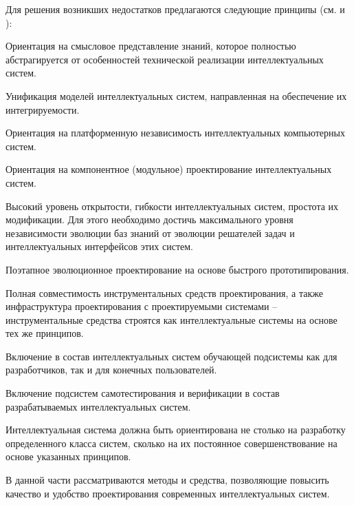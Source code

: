 \begin{partbacktext}
Для решения возникших недостатков предлагаются следующие принципы (см.  и ):
\begin{textitemize}
	\item{Ориентация на смысловое представление знаний, которое полностью абстрагируется от
		особенностей технической реализации интеллектуальных систем.}
	\item{Унификация моделей интеллектуальных систем, направленная на обеспечение их
		интегрируемости.}
	\item{Ориентация на платформенную независимость интеллектуальных компьютерных систем.}
	\item{Ориентация на компонентное (модульное) проектирование интеллектуальных систем.}
	\item{Высокий уровень открытости, гибкости интеллектуальных систем, простота их модификации. Для этого необходимо достичь максимального уровня независимости эволюции баз знаний от эволюции решателей задач и интеллектуальных интерфейсов этих систем.}
	\item{Поэтапное эволюционное проектирование на основе быстрого прототипирования.}
	\item{Полная совместимость инструментальных средств проектирования, а также инфраструктура проектирования с проектируемыми системами – инструментальные средства строятся как интеллектуальные системы на основе тех же принципов.}
	\item{Включение в состав интеллектуальных систем обучающей подсистемы как для разработчиков, так и для конечных пользователей.}
	\item{Включение подсистем самотестирования и верификации в состав разрабатываемых интеллектуальных систем.}
\end{textitemize}

Интеллектуальная система должна быть ориентирована не столько на разработку определенного класса систем, сколько на их постоянное совершенствование  на основе указанных принципов.

В данной части рассматриваются методы и средства, позволяющие повысить качество и удобство проектирования современных интеллектуальных систем.
\end{partbacktext}




